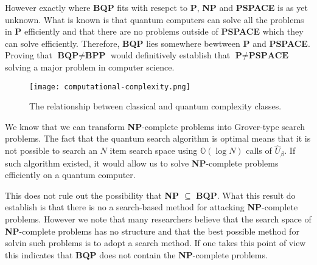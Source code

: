 However exactly where \textbf{BQP} fits with resepct to \textbf{P}, \textbf{NP} and \textbf{PSPACE} is as yet unknown. What is known is that quantum computers can solve all the problems in \textbf{P} efficiently and that there are no problems outside of \textbf{PSPACE} which they can solve efficiently. Therefore, \textbf{BQP} lies somewhere bewtween \textbf{P} and \textbf{PSPACE}.
Proving that $\textbf{BQP} \neq \textbf{BPP}$ would definitively establish that $\textbf{P} \neq \textbf{PSPACE}$ solving a major problem in computer science.


\begin{figure}
\texttt{[image: computational-complexity.png]}
\centering
\caption{The relationship between classical and quantum complexity classes.}
\end{figure}
We know that we can transform \textbf{NP}-complete problems into Grover-type search problems.
The fact that the quantum search algorithm is optimal means that it is not possible to search an $N$ item search space using $\mathbb{O}(\log{N})$ calls of $\hat{U}_\beta$. If such algorithm existed, it would allow us to solve \textbf{NP}-complete problems efficiently on a quantum computer.

This does not rule out the possibility that \textbf{NP} $\subseteq$ \textbf{BQP}. What this result do establish is that there is no a search-based method for attacking \textbf{NP}-complete problems.
However we note that many researchers believe that the search space of \textbf{NP}-complete problems has no structure and that the best possible method for solvin such problems is to adopt a search method. If one takes this point of view this indicates that \textbf{BQP} does not contain the \textbf{NP}-complete problems.